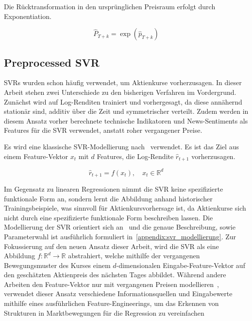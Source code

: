 Die Rücktransformation in den ursprünglichen Preisraum erfolgt durch Exponentiation.

\begin{equation}
    \hat{P}_{T+k} = \exp(\hat{p}_{T+k})
\end{equation}

\subsection{Preprocessed SVR}\label{subsec:preprocessed_svr}

\ac{SVR}s wurden schon häufig verwendet, um Aktienkurse vorherzusagen. In dieser Arbeit stehen zwei Unterschiede zu den bisherigen Verfahren im Vordergrund. Zunächst wird auf Log-Renditen trainiert und vorhergesagt, da diese annähernd stationär sind, additiv über die Zeit und symmetrischer verteilt. Zudem werden in diesem Ansatz vorher berechnete technische Indikatoren und News-Sentiments als Features für die \ac{SVR} verwendet, anstatt roher vergangener Preise.

Es wird eine klassische \ac{SVR}-Modellierung nach~\textcite{drucker1997svr} verwendet. Es ist das Ziel aus einem Feature-Vektor $x_t$ mit $d$ Features, die Log-Rendite $\hat{r}_{t+1}$ vorherzusagen.

\begin{equation}
    \hat{r}_{t+1} = f(x_t), \quad x_t \in \mathbb{R}^d
\end{equation}

Im Gegensatz zu linearen Regressionen nimmt die \ac{SVR} keine spezifizierte funktionale Form an, sondern lernt die Abbildung anhand historischer Trainingsbeispiele, was sinnvoll für Aktienkursvorhersage ist, da Aktienkurse sich nicht durch eine spezifizierte funktionale Form beschreiben lassen. Die Modellierung der \ac{SVR} orientiert sich an~\cite{drucker1997svr} und die genaue Beschreibung, sowie Parameterwahl ist ausführlich formuliert in~\cref{appendix:svr_modellierung}. Zur Fokussierung auf den neuen Ansatz dieser Arbeit, wird die \ac{SVR} als eine Abbildung $f: \mathbb{R}^d \to \mathbb{R}$ abstrahiert, welche mithilfe der vergangenen Bewegungsmuster des Kurses einem $d$-dimensionalen Eingabe-Feature-Vektor auf den geschätzten Aktienpreis des nächsten Tages abbildet. Während andere Arbeiten den Feature-Vektor nur mit vergangenen Preisen modellieren~\cite{tay2001application,oliveira2018stock}, verwendet dieser Ansatz verschiedene Informationsquellen und Eingabewerte mithilfe eines ausführlichen Feature-Engineerings, um das Erkennen von Strukturen in Marktbewegungen für die Regression zu vereinfachen



